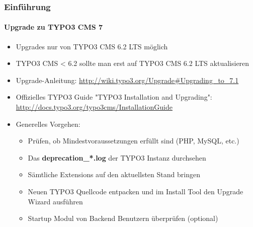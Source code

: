 \begin{frame}[fragile]
	\frametitle{Einführung}
	\framesubtitle{Upgrade zu TYPO3 CMS 7}

	\begin{itemize}
		\item Upgrades nur von TYPO3 CMS 6.2 LTS möglich
		\item TYPO3 CMS < 6.2 sollte man erst auf TYPO3 CMS 6.2 LTS aktualisieren
	\end{itemize}

	\begin{itemize}

		\item Upgrade-Anleitung:\newline
			\smaller\url{http://wiki.typo3.org/Upgrade#Upgrading_to_7.1}\normalsize
		\item Offizielles TYPO3 Guide "TYPO3 Installation and Upgrading":
			\smaller\url{http://docs.typo3.org/typo3cms/InstallationGuide}\normalsize
		\item Generelles Vorgehen:
			\begin{itemize}
				\item Prüfen, ob Mindestvoraussetzungen erfüllt sind \small(PHP, MySQL, etc.)
				\item Das \textbf{deprecation\_*.log} der TYPO3 Instanz durchsehen
				\item Sämtliche Extensions auf den aktuellsten Stand bringen
				\item Neuen TYPO3 Quellcode entpacken und im Install Tool den Upgrade Wizard ausführen
				\item Startup Modul von Backend Benutzern überprüfen (optional)
			\end{itemize}
	\end{itemize}

\end{frame}

